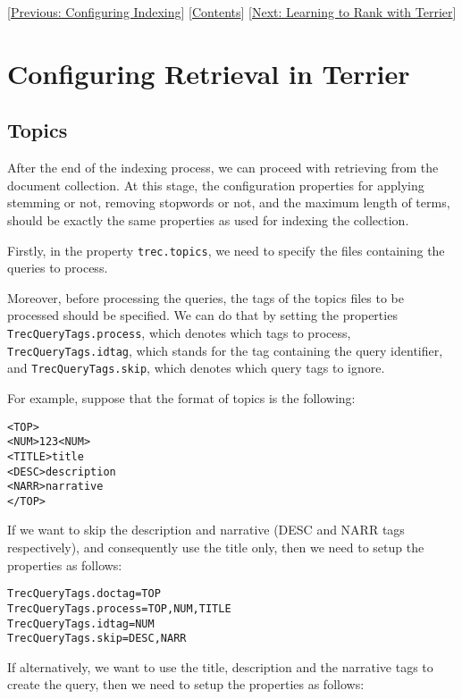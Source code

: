 {[}\href{configure_indexing.html}{Previous: Configuring Indexing}{]}
{[}\href{index.html}{Contents}{]} {[}\href{learning.html}{Next: Learning
to Rank with Terrier}{]}

\section{Configuring Retrieval in
Terrier}\label{configuring-retrieval-in-terrier}

\subsection{Topics}\label{topics}

After the end of the indexing process, we can proceed with retrieving
from the document collection. At this stage, the configuration
properties for applying stemming or not, removing stopwords or not, and
the maximum length of terms, should be exactly the same properties as
used for indexing the collection.

Firstly, in the property \texttt{trec.topics}, we need to specify the
files containing the queries to process.

Moreover, before processing the queries, the tags of the topics files to
be processed should be specified. We can do that by setting the
properties \texttt{TrecQueryTags.process}, which denotes which tags to
process, \texttt{TrecQueryTags.idtag}, which stands for the tag
containing the query identifier, and \texttt{TrecQueryTags.skip}, which
denotes which query tags to ignore.

For example, suppose that the format of topics is the following:

\begin{verbatim}
<TOP>
<NUM>123<NUM>
<TITLE>title
<DESC>description
<NARR>narrative
</TOP>
\end{verbatim}

If we want to skip the description and narrative (DESC and NARR tags
respectively), and consequently use the title only, then we need to
setup the properties as follows:

\begin{verbatim}
TrecQueryTags.doctag=TOP
TrecQueryTags.process=TOP,NUM,TITLE
TrecQueryTags.idtag=NUM
TrecQueryTags.skip=DESC,NARR
\end{verbatim}

If alternatively, we want to use the title, description and the
narrative tags to create the query, then we need to setup the properties
as follows:

